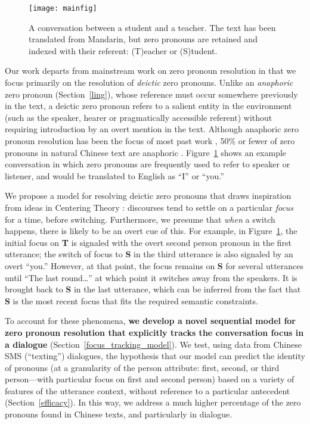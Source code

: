 \documentclass[11pt]{report}
\renewcommand\cite{\citep}	%
\newcommand{\speaker}[1]{{\bf\footnotesize\textsf{#1}}}
\begin{document}
\begin{figure}[t!]\label{sms-ex}
\centering
\texttt{[image: mainfig]}
\caption{A conversation between a student and a teacher. The text has been translated from Mandarin, but zero pronouns are retained and indexed with their referent: (T)eacher or (S)tudent.}%
\end{figure}

Our work departs from mainstream work on zero pronoun resolution in that we focus primarily on the resolution of \emph{deictic} zero pronouns. Unlike an \emph{anaphoric} zero pronoun (Section~\ref{ling}), whose reference must occur somewhere previously in the text, a deictic zero pronoun refers to a salient entity in the environment (such as the speaker, hearer or pragmatically accessible referent) without requiring introduction by an overt mention in the text. Although anaphoric zero pronoun resolution has been the focus of most past work \cite{yeh2007zero,chenchinese}, 50\% or fewer of zero pronouns in natural Chinese text are anaphoric \cite{zhao2007identification,kong2010tree}. Figure~\ref{sms-ex} shows an example conversation in which zero pronouns are frequently used to refer to speaker or listener, and would be translated to English as ``I'' or ``you.''

We propose a model for resolving deictic zero pronouns that draws inspiration from ideas in Centering Theory \cite{grosz1995centering}: discourses tend to settle on a particular \emph{focus} for a time, before switching. Furthermore, we presume that \emph{when} a switch happens, there is likely to be an overt cue of this. For example, in Figure~\ref{sms-ex}, the initial focus on \speaker{T} is signaled with the overt second person pronoun in the first utterance; the switch of focus to \speaker{S} in the third utterance is also signaled by an overt ``you.'' However, at that point, the focus remains on \speaker{S} for several utterances until ``The last round\dots'' at which point it switches away from the speakers. It is brought back to \speaker{S} in the last utterance, which can be inferred from the fact that \speaker{S} is the most recent focus that fits the required semantic constraints.

To account for these phenomena, \textbf{we develop a novel sequential model for zero pronoun resolution that explicitly tracks the conversation focus in a dialogue} (Section~\ref{focus_tracking_model}). We test, using data from Chinese SMS (``texting'') dialogues, the hypothesis that our model can predict the identity of pronouns (at a granularity of the person attribute: first, second, or third person---with particular focus on first and second person) based on a variety of features of the utterance context, without reference to a particular antecedent (Section~\ref{efficacy}). In this way, we address a much higher percentage of the zero pronouns found in Chinese texts, and particularly in dialogue.
\end{document}
